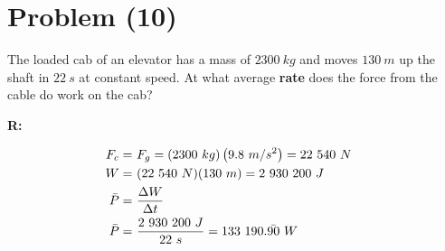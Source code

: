 \section{Problem (10)}
	The loaded cab of an elevator has a mass of $2300 \ kg$ and moves $130 \ m$ up the shaft in $22 \ s$ at constant speed. At what average \textbf{rate} does the force from the cable do work on the cab?

	\textbf{R:}

	\begin{align}
		F_{c} = \ &F_{g} = (2300 \ kg)\left(9.8 \ m/s^{2}\right) = 22 \ 540 \ N& \notag \\
		W = \ &(22 \ 540 \ N)(130 \ m) = 2 \ 930 \ 200 \ J& \notag \\
		\bar{P} = \ &\frac{\Delta W}{\Delta t}& \notag \\
		\bar{P} = \ &\frac{2 \ 930 \ 200 \ J}{22 \ s} = 133 \ 190.\bar{90} \ W&
	\end{align}
